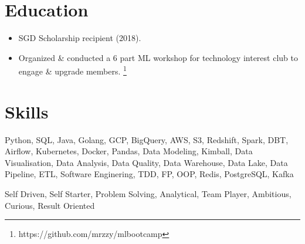 \section{Education}
\begin{itemize}
  \item SGD Scholarship recipient (2018).
  \item Organized \& conducted a 6 part ML workshop for technology interest club to engage \& upgrade members. \footnote{https://github.com/mrzzy/mlbootcamp}
\end{itemize}

\section{Skills}
\begin{description}
  \footnotesize{
  \item[Technical] Python, SQL, Java, Golang, GCP, BigQuery, AWS, S3, Redshift, Spark, DBT, Airflow, Kubernetes, Docker, Pandas, Data Modeling, Kimball, Data Visualisation, Data Analysis, Data Quality, Data Warehouse, Data Lake, Data Pipeline, ETL, Software Enginering, TDD, FP, OOP, Redis, PostgreSQL, Kafka
  \item[People]
    Self Driven, Self Starter, Problem Solving, Analytical, Team Player, Ambitious, Curious, Result Oriented
  }
\end{description}
